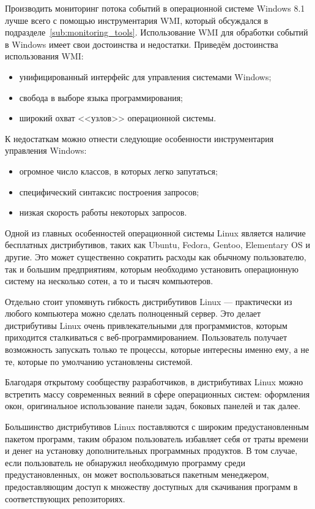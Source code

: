 Производить мониторинг потока событий в операционной системе Windows 8.1
лучше всего с помощью инструментария WMI, который обсуждался
в подразделе~\ref{sub:monitoring_tools}. Использование WMI для обработки
событий в Windows имеет свои достоинства и недостатки. Приведём достоинства
использования WMI:
\begin{itemize}
  \item унифицированный интерфейс для управления системами Windows;
  \item свобода в выборе языка программирования;
  \item широкий охват <<узлов>> операционной системы.
\end{itemize}

К недостаткам можно отнести следующие особенности инструментария управления
Windows:
\begin{itemize}
  \item огромное число классов, в которых легко запутаться;
  \item специфический синтаксис построения запросов;
  \item низкая скорость работы некоторых запросов.
\end{itemize}

Одной из главных особенностей операционной системы Linux является наличие
бесплатных дистрибутивов, таких как Ubuntu, Fedora, Gentoo, Elementary OS и другие.
Это может существенно сократить расходы как обычному пользователю,
так и большим предприятиям, которым необходимо установить операционную
систему на несколько сотен, а то и тысяч компьютеров.

Отдельно стоит упомянуть гибкость дистрибутивов Linux --- практически из
любого компьютера можно сделать полноценный сервер. Это делает дистрибутивы
Linux очень привлекательными для программистов, которым приходится сталкиваться
с веб-программированием.  Пользователь получает
возможность запускать только те процессы, которые интересны именно ему, а не те,
которые по умолчанию установлены системой.

Благодаря открытому сообществу разработчиков, в дистрибутивах Linux можно
встретить массу современных веяний в сфере операционных систем: оформления
окон, оригинальное использование панели задач, боковых панелей и так далее.

Большинство дистрибутивов Linux поставляются с широким предустановленным
пакетом программ, таким образом пользователь избавляет себя от траты времени
и денег на установку дополнительных программных продуктов. В том случае, если
пользователь не обнаружил необходимую программу среди предустановленных, он
может воспользоваться пакетным менеджером, предоставляющим доступ к
множеству доступных для скачивания программ в соответствующих репозиториях.

